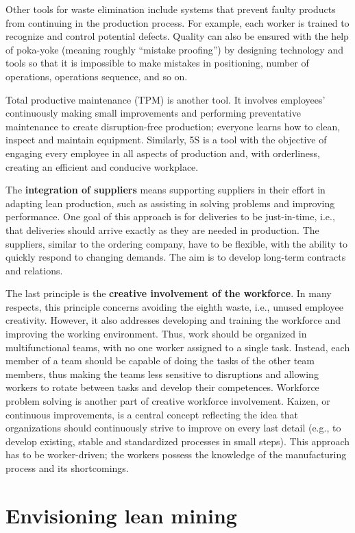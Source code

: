 \documentclass[
  12pt,
]{scrbook}
\begin{document}
Other tools for waste elimination include systems that prevent faulty products from continuing in the production process. For example, each worker is trained to recognize and control potential defects. Quality can also be ensured with the help of poka-yoke (meaning roughly ``mistake proofing'') by designing technology and tools so that it is impossible to make mistakes in positioning, number of operations, operations sequence, and so on.

Total productive maintenance (TPM) is another tool. It involves employees' continuously making small improvements and performing preventative maintenance to create disruption-free production; everyone learns how to clean, inspect and maintain equipment. Similarly, 5S is a tool with the objective of engaging every employee in all aspects of production and, with orderliness, creating an efficient and conducive workplace.

The \textbf{integration of suppliers} means supporting suppliers in their effort in adapting lean production, such as assisting in solving problems and improving performance. One goal of this approach is for deliveries to be just-in-time, i.e., that deliveries should arrive exactly as they are needed in production. The suppliers, similar to the ordering company, have to be flexible, with the ability to quickly respond to changing demands. The aim is to develop long-term contracts and relations.

The last principle is the \textbf{creative involvement of the workforce}. In many respects, this principle concerns avoiding the eighth waste, i.e., unused employee creativity. However, it also addresses developing and training the workforce and improving the working environment. Thus, work should be organized in multifunctional teams, with no one worker assigned to a single task. Instead, each member of a team should be capable of doing the tasks of the other team members, thus making the teams less sensitive to disruptions and allowing workers to rotate between tasks and develop their competences. Workforce problem solving is another part of creative workforce involvement. Kaizen, or continuous improvements, is a central concept reflecting the idea that organizations should continuously strive to improve on every last detail (e.g., to develop existing, stable and standardized processes in small steps). This approach has to be worker-driven; the workers possess the knowledge of the manufacturing process and its shortcomings.

\hypertarget{envisioning-lean-mining}{%
\section*{Envisioning lean mining}\label{envisioning-lean-mining}}
\end{document}
